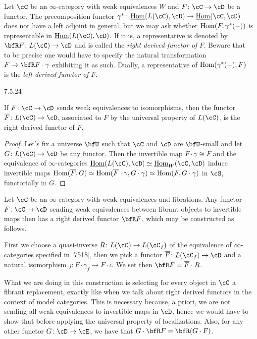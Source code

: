 \begin{rmk}
  Let $\cC$ be an $\infty$-category with weak equivalences $W$ and
  $F\colon\cC\rightarrow\cD$ be a functor. The precomposition functor
  $\gamma^*\colon\home(L(\cC),\cD)\rightarrow\home(\cC,\cD)$ does not have a
  left adjoint in general, but we may ask whether $\operatorname{Hom}(F,\gamma^*(-))$ is
  representable in $\home(L(\cC),\cD)$. If it is, a representative is denoted by
  $\bfR F\colon L(\cC)\rightarrow\cD$ and is called the \emph{right derived
  functor of $F$}. Beware that to be precise one would have to specify the
  natural transformation $F\rightarrow\bfR F\cdot\gamma$ exhibiting it as such.
  Dually, a representative of $\operatorname{Hom}(\gamma^*(-),F)$ is the \emph{left derived
  functor of $F$}.
\end{rmk}

\begin{prop}\label{7524}
  7.5.24

  If $F\colon\cC\rightarrow\cD$ sends weak equivalences to isomorphisms, then
  the functor $\overline{F}\colon L(\cC)\rightarrow\cD$, associated to $F$ by
  the universal property of $L(\cC)$, is the right derived functor of $F$.
\end{prop}
\begin{proof}
  Let's fix a universe $\bfU$ such that $\cC$ and $\cD$ are $\bfU$-small and let
  $G\colon L(\cC)\rightarrow\cD$ be any functor. Then the invertible map
  $\overline{F}\cdot\gamma\cong F$ and the equivalence of $\infty$-categories
  $\home(L(\cC),\cD)\simeq\home_W(\cC,\cD)$ induce invertible maps
  $\operatorname{Hom}(\overline{F},G)\simeq\operatorname{Hom}(\overline{F}\cdot\gamma,G\cdot\gamma)\simeq\operatorname{Hom}(F,G\cdot\gamma)$
  in $\cS$, functorially in $G$.
\end{proof}

\begin{construction}\label{7525}

  Let $\cC$ be an $\infty$-category with weak equivalences and fibrations. Any
  functor $F\colon\cC\rightarrow\cD$ sending weak equivalences between fibrant
  objects to invertible maps then has a right derived functor $\bfR F$, which
  may be constructed as follows.

  First we choose a quasi-inverse $R\colon L(\cC)\rightarrow L(\cC_f)$ of the
  equivalence of $\infty$-categories specified in \ref{7518}, then we pick a
  functor $\overline{F}\colon L(\cC_f)\rightarrow\cD$ and a natural isomorphism
  $j\colon\overline{F}\cdot\gamma_f\rightarrow F\cdot\iota$. We set then $\bfR
  F=\overline{F}\cdot R$.

  What we are doing in this construction is selecting
  for every object in $\cC$ a fibrant replacement, exactly like when we talk
  about right derived functors in the context of model categories. This is
  necessary because, a priori, we are not sending all weak equivalences to
  invertible maps in $\cD$, hence we would have to show that before applying the
  universal property of localizations. Also, for any
  other functor $G\colon\cD\rightarrow\cE$, we have that $G\cdot\bfR
  F=\bfR(G\cdot F)$.
\end{construction}

